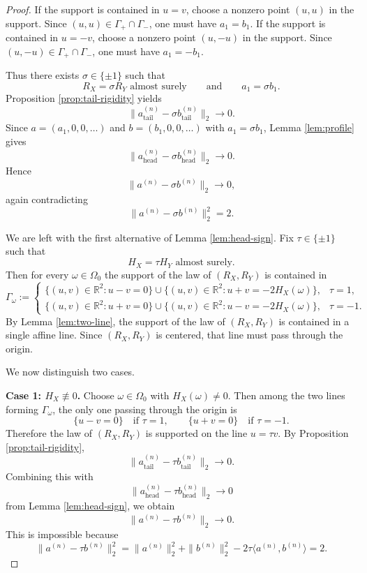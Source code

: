 \documentclass[11pt]{amsart}
\newcommand{\R}{\mathbb R}
\begin{document}
\begin{proof}
If the support is contained in $u=v$, choose a nonzero point $(u,u)$ in the
support. Since $(u,u) \in \Gamma_+ \cap \Gamma_-$, one must have $a_1=b_1$.
If the support is contained in $u=-v$, choose a nonzero point $(u,-u)$ in the
support. Since $(u,-u) \in \Gamma_+ \cap \Gamma_-$, one must have $a_1=-b_1$.

Thus there exists $\sigma \in \{\pm 1\}$ such that
\[
R_X=\sigma R_Y \text{ almost surely}
\qquad
\text{and}
\qquad
a_1=\sigma b_1.
\]
Proposition \ref{prop:tail-rigidity} yields
\[
\|a^{(n)}_{\mathrm{tail}} - \sigma b^{(n)}_{\mathrm{tail}}\|_2 \longrightarrow 0.
\]
Since $a=(a_1,0,0,\dots)$ and $b=(b_1,0,0,\dots)$ with $a_1=\sigma b_1$,
Lemma \ref{lem:profile} gives
\[
\|a^{(n)}_{\mathrm{head}} - \sigma b^{(n)}_{\mathrm{head}}\|_2 \longrightarrow 0.
\]
Hence
\[
\|a^{(n)}-\sigma b^{(n)}\|_2 \longrightarrow 0,
\]
again contradicting
\[
\|a^{(n)}-\sigma b^{(n)}\|_2^2 = 2.
\]

We are left with the first alternative of Lemma \ref{lem:head-sign}. Fix
$\tau \in \{\pm 1\}$ such that
\[
H_X=\tau H_Y \text{ almost surely.}
\]
Then for every $\omega \in \Omega_0$ the support of the law of $(R_X,R_Y)$ is
contained in
\[
\Gamma_\omega :=
\begin{cases}
\{(u,v)\in\R^2 : u-v=0\} \cup \{(u,v)\in\R^2 : u+v=-2H_X(\omega)\},
& \tau=1, \\[2mm]
\{(u,v)\in\R^2 : u+v=0\} \cup \{(u,v)\in\R^2 : u-v=-2H_X(\omega)\},
& \tau=-1.
\end{cases}
\]
By Lemma \ref{lem:two-line}, the support of the law of $(R_X,R_Y)$ is
contained in a single affine line. Since $(R_X,R_Y)$ is centered, that line
must pass through the origin.

We now distinguish two cases.

\medskip
\noindent
\textbf{Case 1: $H_X \not\equiv 0$.}
Choose $\omega \in \Omega_0$ with $H_X(\omega)\ne 0$. Then among the two lines
forming $\Gamma_\omega$, the only one passing through the origin is
\[
\{u-v=0\} \quad \text{if } \tau=1,
\qquad
\{u+v=0\} \quad \text{if } \tau=-1.
\]
Therefore the law of $(R_X,R_Y)$ is supported on the line $u=\tau v$. By
Proposition \ref{prop:tail-rigidity},
\[
\|a^{(n)}_{\mathrm{tail}} - \tau b^{(n)}_{\mathrm{tail}}\|_2 \longrightarrow 0.
\]
Combining this with
\[
\|a^{(n)}_{\mathrm{head}} - \tau b^{(n)}_{\mathrm{head}}\|_2 \longrightarrow 0
\]
from Lemma \ref{lem:head-sign}, we obtain
\[
\|a^{(n)}-\tau b^{(n)}\|_2 \longrightarrow 0.
\]
This is impossible because
\[
\|a^{(n)}-\tau b^{(n)}\|_2^2
=
\|a^{(n)}\|_2^2 + \|b^{(n)}\|_2^2 - 2\tau \langle a^{(n)},b^{(n)}\rangle
= 2.
\]


\end{proof}
\end{document}
